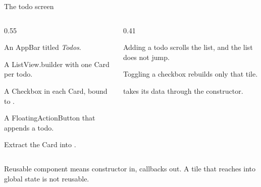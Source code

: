 \documentclass[10pt,aspectratio=169,t]{beamer}
\begin{document}
\begin{frame}[eyebrow=Task I]{The todo screen}
  \begin{columns}[T]
    \begin{column}{0.55\textwidth}
      \begin{steps}
        \item An AppBar titled \emph{Todos}.
        \item A ListView.builder with one Card per todo.
        \item A Checkbox in each Card, bound to .
        \item A FloatingActionButton that appends a todo.
        \item Extract the Card into .
      \end{steps}
    \end{column}
    \begin{column}{0.41\textwidth}
      \begin{checklist}
        \item Adding a todo scrolls the list, and the list does not jump.
        \item Toggling a checkbox rebuilds only that tile.
        \item {} takes its data through the constructor.
      \end{checklist}
    \end{column}
  \end{columns}
  \begin{takeaway}{Reusable component means constructor in, callbacks out.}
    A tile that reaches into global state is not reusable.
  \end{takeaway}
\end{frame}
\end{document}
